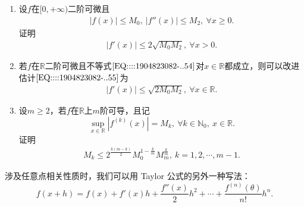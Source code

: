 \documentclass[../../main.tex]{subfiles}
\begin{document}
\begin{proposition}[导数内插]\label{proposition:导数内插}
\begin{enumerate}
\item 设\( f \)在\( [0,+\infty) \)二阶可微且
\begin{align}
|f(x)| \leqslant M_0, \ |f''(x)| \leqslant M_2, \ \forall x \geqslant 0. \label{EQ::::1904823082-..54}
\end{align}
证明
\begin{align}
|f'(x)| \leqslant 2\sqrt{M_0 M_2}, \ \forall x > 0. \label{EQ::::1904823082-..55}
\end{align}

\item 若\( f \)在\( \mathbb{R} \)二阶可微且不等式\(\eqref{EQ::::1904823082-..54}\)对\( x \in \mathbb{R} \)都成立，则可以改进估计\(\eqref{EQ::::1904823082-..55}\)为
\begin{align}
|f'(x)| \leqslant \sqrt{2 M_0 M_2}, \ \forall x \in \mathbb{R}. \label{EQ::::1904823082-..56}
\end{align}

\item 设\( m \geqslant 2 \)，若\( f \)在\( \mathbb{R} \)上\( m \)阶可导，且记
\[
\sup_{x \in \mathbb{R}} \left| f^{(k)}(x) \right| = M_k, \ \forall k \in \mathbb{N}_0, \ x \in \mathbb{R}.
\]
证明
\begin{align}
M_k \leqslant 2^{\frac{k(m - k)}{2}} M_0^{1 - \frac{k}{m}} M_m^{\frac{k}{m}}, \ k = 1,2,\cdots, m - 1. \label{EQ::::1904823082-..57}
\end{align}
\end{enumerate}
\end{proposition}
\begin{note}
涉及任意点相关性质时，我们可以用 Taylor 公式的另外一种写法：
\[
f(x + h) = f(x) + f'(x)h + \frac{f''(x)}{2} h^2 + \cdots + \frac{f^{(n)}(\theta)}{n!} h^n.
\]
\end{note}
\end{document}
